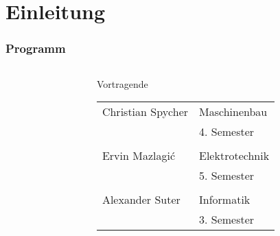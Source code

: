 \section{Einleitung}

\author{Ervin Mazlagi\'c}

\begin{frame}
	\frametitle{Programm\hfill{}\footnotesize \group}
	\begin{columns}
		\begin{column}{0.4\textwidth}
			\tableofcontents[hideallsubsections]
		\end{column}
		\begin{column}{0.6\textwidth}
			\begin{block}{Vortragende}
				\begin{tabular}{l l}
					Christian Spycher
						& Maschinenbau \\
						& 4. Semester \\
					& \\
					Ervin Mazlagi\'c
						& Elektrotechnik \\
						& 5. Semester \\
					& \\
					Alexander Suter
						& Informatik \\
						& 3. Semester \\
				\end{tabular}
			\end{block}
		\end{column}
	\end{columns}
\end{frame}
